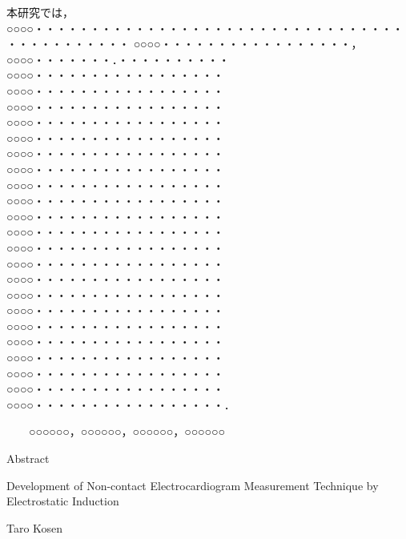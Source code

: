 \documentclass[12pt,uplatex]{jsreport}
\begin{document}
    \begin{spacing}{1.1}
        本研究では，○○○○・・・・・・・・・・・・・・・・・・・・・・・・・・・・・・・・・・・・・・・・・・・・
        ○○○○・・・・・・・・・・・・・・・・・，○○○○・・・・・・・．・・・・・・・・・・○○○○・・・・・・・・・・・・・・・・・○○○○・・・・・・・・・・・・・・・・・○○○○・・・・・・・・・・・・・・・・・○○○○・・・・・・・・・・・・・・・・・○○○○・・・・・・・・・・・・・・・・・○○○○・・・・・・・・・・・・・・・・・○○○○・・・・・・・・・・・・・・・・・○○○○・・・・・・・・・・・・・・・・・○○○○・・・・・・・・・・・・・・・・・○○○○・・・・・・・・・・・・・・・・・○○○○・・・・・・・・・・・・・・・・・○○○○・・・・・・・・・・・・・・・・・○○○○・・・・・・・・・・・・・・・・・○○○○・・・・・・・・・・・・・・・・・○○○○・・・・・・・・・・・・・・・・・○○○○・・・・・・・・・・・・・・・・・○○○○・・・・・・・・・・・・・・・・・○○○○・・・・・・・・・・・・・・・・・○○○○・・・・・・・・・・・・・・・・・○○○○・・・・・・・・・・・・・・・・・○○○○・・・・・・・・・・・・・・・・・○○○○・・・・・・・・・・・・・・・・・．
    \end{spacing}

    \vspace{2em}

    \noindent
    　　○○○○○○，○○○○○○，○○○○○○，○○○○○○

    \newpage
    \vspace*{1.6em}
    \begin{center}
        {\large \textsf{Abstract}}

        \vspace{2.5em}

        {\large Development of Non-contact Electrocardiogram Measurement Technique by Electrostatic Induction}

        \vspace{2.5em}

        {\large Taro Kosen}

        \vspace{2em}
    \end{center}
\end{document}
